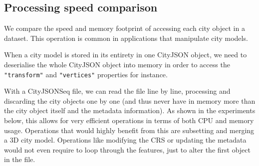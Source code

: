 \documentclass{isprs} %
\begin{document}
\subsection{Processing speed comparison}

We compare the speed and memory footprint of accessing each city object in a dataset.
This operation is common in applications that manipulate city models.

When a city model is stored in its entirety in one CityJSON object, we need to deserialise the whole CityJSON object into memory in order to access the \texttt{"transform"} and \texttt{"vertices"} properties for instance.

With a CityJSONSeq file, we can read the file line by line, processing and discarding the city objects one by one (and thus never have in memory more than the city object itself and the metadata information).
As shown in the experiments below, this allows for very efficient operations in terms of both CPU and memory usage.
Operations that would highly benefit from this are subsetting and merging a 3D city model.
Operations like modifying the CRS or updating the metadata would not even require to loop through the features, just to alter the first object in the file.

%
\end{document}
